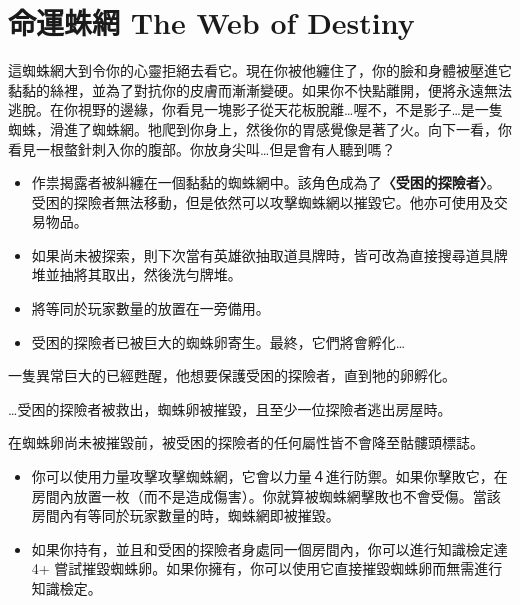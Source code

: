
\chapter{命運蛛網 The Web of Destiny}

\begin{HauntStory}
  這蜘蛛網大到令你的心靈拒絕去看它。現在你被他纏住了，你的臉和身體被壓進它黏黏的絲裡，並為了對抗你的皮膚而漸漸變硬。如果你不快點離開，便將永遠無法逃脫。在你視野的邊緣，你看見一塊影子從天花板脫離…喔不，不是影子…是一隻蜘蛛，滑進了蜘蛛網。牠爬到你身上，然後你的胃感覺像是著了火。向下一看，你看見一根螫針刺入你的腹部。你放身尖叫…但是會有人聽到嗎？
\end{HauntStory}

\vspace*{-1em}
\begin{itemize}
  \item 作祟揭露者被糾纏在一個黏黏的蜘蛛網中。該角色成為了\textbf{〈受困的探險者〉}。受困的探險者無法移動，但是依然可以攻擊蜘蛛網以摧毀它。他亦可使用及交易物品。
  \item 如果尚未被探索，則下次當有英雄欲抽取道具牌時，皆可改為直接搜尋道具牌堆並抽將其取出，然後洗勻牌堆。
  \item 將等同於玩家數量的放置在一旁備用。
  \item 受困的探險者已被巨大的蜘蛛卵寄生。最終，它們將會孵化…
\end{itemize}

一隻異常巨大的已經甦醒，他想要保護受困的探險者，直到牠的卵孵化。

…受困的探險者被救出，蜘蛛卵被摧毀，且至少一位探險者逃出房屋時。

\vfill\null\pagebreak

在蜘蛛卵尚未被摧毀前，被受困的探險者的任何屬性皆不會降至骷髏頭標誌。
\begin{itemize}
  \item 你可以使用力量攻擊攻擊蜘蛛網，它會以力量４進行防禦。如果你擊敗它，在房間內放置一枚（而不是造成傷害）。你就算被蜘蛛網擊敗也不會受傷。當該房間內有等同於玩家數量的時，蜘蛛網即被摧毀。
  \item 如果你持有，並且和受困的探險者身處同一個房間內，你可以進行知識檢定達 4+ 嘗試摧毀蜘蛛卵。如果你擁有，你可以使用它直接摧毀蜘蛛卵而無需進行知識檢定。
\end{itemize}

